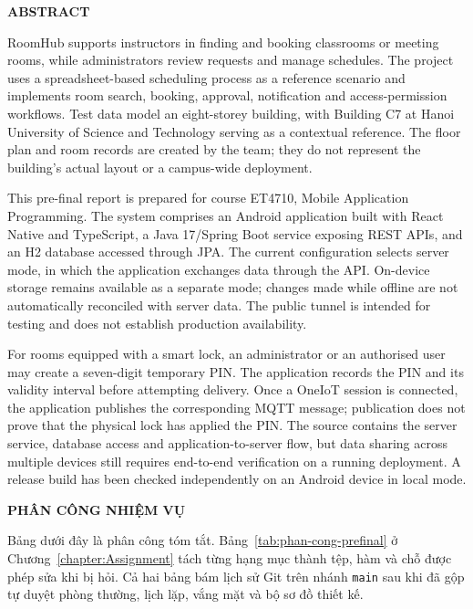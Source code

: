 \documentclass[../DoAn.tex]{subfiles}
\begin{document}
\begin{center}\bfseries\large ABSTRACT\end{center}
\vspace{0.5cm}
RoomHub supports instructors in finding and booking classrooms or meeting rooms, while administrators review requests and manage schedules. The project uses a spreadsheet-based scheduling process as a reference scenario and implements room search, booking, approval, notification and access-permission workflows. Test data model an eight-storey building, with Building C7 at Hanoi University of Science and Technology serving as a contextual reference. The floor plan and room records are created by the team; they do not represent the building's actual layout or a campus-wide deployment.

This pre-final report is prepared for course ET4710, Mobile Application Programming. The system comprises an Android application built with React Native and TypeScript, a Java 17/Spring Boot service exposing REST APIs, and an H2 database accessed through JPA. The current configuration selects server mode, in which the application exchanges data through the API. On-device storage remains available as a separate mode; changes made while offline are not automatically reconciled with server data. The public tunnel is intended for testing and does not establish production availability.

For rooms equipped with a smart lock, an administrator or an authorised user may create a seven-digit temporary PIN. The application records the PIN and its validity interval before attempting delivery. Once a OneIoT session is connected, the application publishes the corresponding MQTT message; publication does not prove that the physical lock has applied the PIN. The source contains the server service, database access and application-to-server flow, but data sharing across multiple devices still requires end-to-end verification on a running deployment. A release build has been checked independently on an Android device in local mode.

\newpage

\begin{center}
    \Large{\textbf{PHÂN CÔNG NHIỆM VỤ}}\\
\end{center}

\vspace{0.8cm}

Bảng dưới đây là phân công tóm tắt. Bảng~\ref{tab:phan-cong-prefinal} ở Chương~\ref{chapter:Assignment} tách từng hạng mục thành tệp, hàm và chỗ được phép sửa khi bị hỏi. Cả hai bảng bám lịch sử Git trên nhánh \texttt{main} sau khi đã gộp tự duyệt phòng thường, lịch lặp, vắng mặt và bộ sơ đồ thiết kế.
\end{document}
